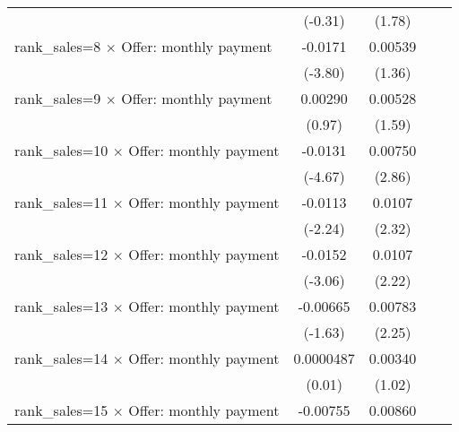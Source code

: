 {\begin{tabular}{l*{4}{c}}
                    &     (-0.31)         &      (1.78)         &                     &                     \\
rank\_sales=8 $\times$ Offer: monthly payment&     -0.0171\sym{***}&     0.00539         &                     &                     \\
                    &     (-3.80)         &      (1.36)         &                     &                     \\
rank\_sales=9 $\times$ Offer: monthly payment&     0.00290         &     0.00528         &                     &                     \\
                    &      (0.97)         &      (1.59)         &                     &                     \\
rank\_sales=10 $\times$ Offer: monthly payment&     -0.0131\sym{***}&     0.00750\sym{**} &                     &                     \\
                    &     (-4.67)         &      (2.86)         &                     &                     \\
rank\_sales=11 $\times$ Offer: monthly payment&     -0.0113\sym{*}  &      0.0107\sym{*}  &                     &                     \\
                    &     (-2.24)         &      (2.32)         &                     &                     \\
rank\_sales=12 $\times$ Offer: monthly payment&     -0.0152\sym{**} &      0.0107\sym{*}  &                     &                     \\
                    &     (-3.06)         &      (2.22)         &                     &                     \\
rank\_sales=13 $\times$ Offer: monthly payment&    -0.00665         &     0.00783\sym{*}  &                     &                     \\
                    &     (-1.63)         &      (2.25)         &                     &                     \\
rank\_sales=14 $\times$ Offer: monthly payment&   0.0000487         &     0.00340         &                     &                     \\
                    &      (0.01)         &      (1.02)         &                     &                     \\
rank\_sales=15 $\times$ Offer: monthly payment&    -0.00755\sym{*}  &     0.00860\sym{**} &                     &                     \\

\end{tabular}}
